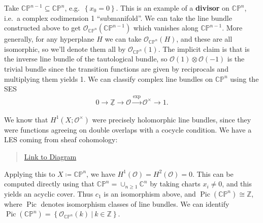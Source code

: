 \begin{example}[?]

Take \({\mathbb{CP}}^{n-1} \subseteq {\mathbb{CP}}^n\),
e.g.~\(\left\{{ x_0 = 0 }\right\}\). This is an example of a
\textbf{divisor} on \({\mathbb{CP}}^n\), i.e.~a complex codimension 1
``submanifold''. We can take the line bundle constructed above to get
\({\mathcal{O}}_{{\mathbb{CP}}^n}({\mathbb{CP}}^{n-1})\) which vanishes
along \({\mathbb{CP}}^{n-1}\). More generally, for any hyperplane \(H\)
we can take \({\mathcal{O}}_{{\mathbb{CP}}^n}(H)\), and these are all
isomorphic, so we'll denote them all by
\({\mathcal{O}}_{{\mathbb{CP}}^n}(1)\). The implicit claim is that is
the inverse line bundle of the tautological bundle, so
\({\mathcal{O}}(1) \otimes{\mathcal{O}}(-1)\) is the trivial bundle
since the transition functions are given by reciprocals and multiplying
them yields 1. We can classify complex line bundles on
\({\mathbb{CP}}^n\) using the SES
\begin{align*}
0 \to \underline{{\mathbb{Z}}} \to {\mathcal{O}}\xrightarrow{\exp} {\mathcal{O}}^{\times}\to 1
.\end{align*}

We know that \(H^1(X; {\mathcal{O}}^{\times})\) were precisely
holomorphic line bundles, since they were functions agreeing on double
overlaps with a cocycle condition. We have a LES coming from sheaf
cohomology:

\begin{center}
\end{center}

\begin{quote}
\href{https://q.uiver.app/?q=WzAsNixbMiwyLCJIXjEoWDsgXFxPTykiXSxbNCwyLCJIXjEoWDsgXFxPT1xcdW5pdHMpIl0sWzAsNCwiSF4yKFg7IFxcT08pIl0sWzAsMiwiSF4xKFg7IFxcT08pIl0sWzQsMCwiXFxjZG90cyJdLFsyLDQsIlxcY2RvdHMiXSxbMSwyLCJjXzEiXSxbMywwXSxbMCwxXSxbMiw1XSxbNCwzXV0=}{Link
to Diagram}
\end{quote}

Applying this to \(X\coloneqq{\mathbb{CP}}^n\), we have
\(H^1({\mathcal{O}}) = H^2({\mathcal{O}}) = 0\). This can be computed
directly using that \({\mathbb{CP}}^n = \cup_{n\geq 1} {\mathbb{C}}^n\)
by taking charts \(x_i\neq 0\), and this yields an acyclic cover. Thus
\(c_1\) is an isomorphism above, and
\({\operatorname{Pic}}({\mathbb{CP}}^n) \cong {\mathbb{Z}}\), where
\({\operatorname{Pic}}\) denotes isomorphism classes of line bundles. We
can identify
\({\operatorname{Pic}}({\mathbb{CP}}^n) = \left\{{ {\mathcal{O}}_{{\mathbb{CP}}^n}(k) {~\mathrel{\Big|}~}k\in {\mathbb{Z}}}\right\}\).

\end{example}


